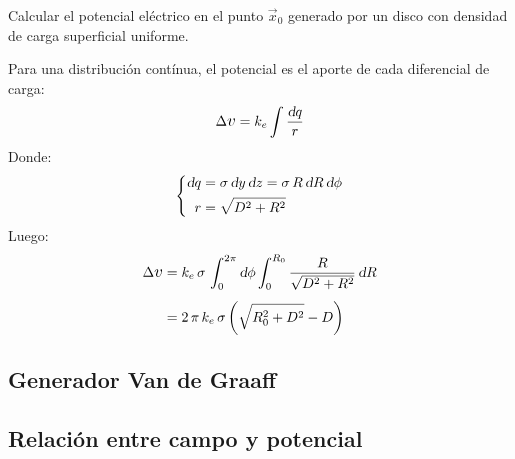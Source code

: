 \begin{mdframed}[style=ExampleFrame]
    \begin{example}
    \end{example}
    \begin{formatI}
        Calcular el potencial eléctrico en el punto $\vec{x}_0$ generado por un disco con densidad de carga superficial uniforme.
    \end{formatI}
    \begin{center}
        \def\svgwidth{\linewidth}
        
    \end{center}
    Para una distribución contínua, el potencial es el aporte de cada diferencial de carga:
    \begin{equation*}
        \Delta \voltage = \cstcoulomb \int \frac{\dif q}{r}
    \end{equation*}
    Donde:
    \begin{equation*}
        \left\{
        \begin{aligned}
            \textsl{d} q &= \sigma \, \textsl{d} y \, \textsl{d} z = \sigma \, R \, \textsl{d} R \, \textsl{d} \phi
            \\
            r &= \sqrt{D^2+R^2}
        \end{aligned}
        \right.
    \end{equation*}
    Luego:
    \begin{align*}
        \Delta \voltage &= \cstcoulomb \, \sigma \, \int_0^{2\pi} \dif \phi \int_0^{R_0} \frac{R}{\sqrt{D^2+R^2}} \, \dif R
        \\[1ex]
        &= 2 \, \pi \, \cstcoulomb \, \sigma \inParentheses{\sqrt{R_0^2 + D^2} - D}
    \end{align*}
\end{mdframed}


\subsection{Generador Van de Graaff}

\begin{center}
    \def\svgwidth{0.8\linewidth}
    
\end{center}


\subsection{Relación entre campo y potencial}

